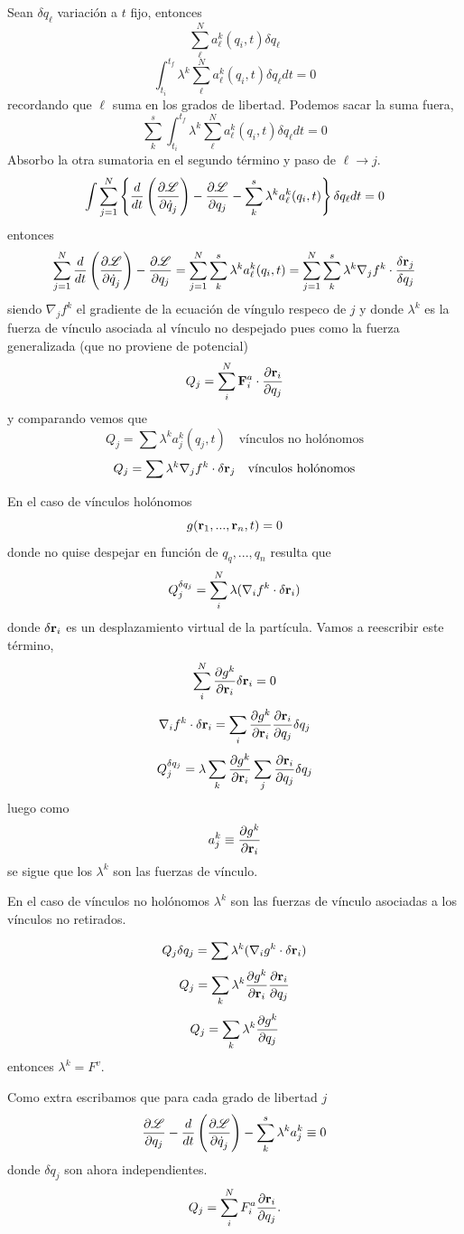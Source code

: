\documentclass[10pt,oneside]{CBFT_article}
\begin{document}
Sean $\delta q_\ell$ variación a $t$ fijo, entonces 
\[
\sum_{\ell}^N a_\ell^k(q_i,t) \delta {q}_\ell
\]
\[
\int_{t_i}^{t_f} \lambda^k \sum_{\ell}^N a_\ell^k(q_i,t) \delta {q}_\ell dt = 0
\]
recordando que $\ell$ suma en los grados de libertad. Podemos sacar la suma fuera,
\[
\sum_{k}^s \int_{t_i}^{t_f} \lambda^k \sum_{\ell}^N a_\ell^k(q_i,t) \delta {q}_\ell dt = 0
\]
Absorbo la otra sumatoria en el segundo término y paso de $\ell \to j$.
\[
\int  \sum_{j=1}^N \left\{ \frac{d}{dt}\left( \frac{\partial^{\hspace{-0.05em}} {\mathscr{L}}}{\partial {\dot{q}_j}^{\hspace{-0.05em}}} \right) -\frac{\partial^{\hspace{-0.05em}} {\mathscr{L}}}{\partial {q_j}^{\hspace{-0.05em}}}
- \sum_{k}^s \lambda^k a_\ell^k(q_i,t) \right\} \delta {q}_\ell dt = 0
\]
entonces 
\[
\sum_{j=1}^N \frac{d}{dt}\left( \dpar{\Lag}{\dot{q}_j} \right) -\dpar{\Lag}{q_j} =
\sum_{j=1}^N \sum_{k}^s \lambda^k a_\ell^k(q_i,t) =  
\sum_{j=1}^N \sum_{k}^s \lambda^k \nabla_j f^k \cdot \frac{\delta \vb{r}_j}{\delta q_j} 
\]
siendo $\nabla_j f^k $ el gradiente de la ecuación de víngulo respeco de $j$ y donde $\lambda^k$
es la fuerza de vínculo asociada al vínculo no despejado pues como la fuerza generalizada
(que no proviene de potencial)
\[
Q_j = \sum_i^N \vb{F}_i^a \cdot \dpar{\vb{r}_i}{q_j}
\]
y comparando vemos que 
\[
Q_j = \sum \lambda^k a^k_j(q_j,t) \quad \textrm{vínculos no holónomos}
\]
\[
Q_j=  \sum \lambda^k \nabla_j f^k \cdot \delta \vb{r}_j  \quad \textrm{vínculos holónomos}
\]

En el caso de vínculos holónomos 
\[
g(\vb{r}_1,...,\vb{r}_n,t) = 0 
\]
donde no quise despejar en función de $q_q,...,q_n$ resulta que 
\[
Q_j^{\delta q_j} =  \sum_i^N \lambda (\nabla_i f^k\cdot\delta\vb{r}_i)
\]
donde $\delta\vb{r}_i$ es un desplazamiento virtual de la partícula.
Vamos a reescribir este término,
\[
\sum_i^N \dpar{g^k}{\vb{r}_i} \delta \vb{r}_i = 0
\]
\[
\nabla_i f^k\cdot\delta\vb{r}_i = \sum_i \dpar{g^k}{\vb{r}_i} \dpar{\vb{r}_i}{q_j} \delta q_j
\]
\[
Q_j^{\delta q_j} =  \lambda \sum_k \dpar{g^k}{\vb{r}_i} \sum_j \dpar{\vb{r}_i}{q_j} \delta q_j
\]
luego como 
\[
a^k_j \equiv \dpar{g^k}{\vb{r}_i}
\]
se sigue que los $\lambda^k$ son las fuerzas de vínculo.

En el caso de vínculos no holónomos $\lambda^k$ son las fuerzas de vínculo asociadas a los 
vínculos no retirados.

\[
Q_j {\delta q_j} =  \sum \lambda^k (\nabla_i g^k\cdot\delta\vb{r}_i)
\]
\[
Q_j =  \sum_k \lambda^k \dpar{g^k}{\vb{r}_i} \dpar{\vb{r}_i}{q_j}
\]
\[
Q_j =  \sum_k \lambda^k \frac{\partial^{\hspace{-0.05em}} {g^k}}{\partial {q_j}^{\hspace{-0.05em}}}
\]
entonces $\lambda^k=F^v$.

Como extra escribamos que para cada grado de libertad $j$ 
\[
\frac{\partial^{\hspace{-0.05em}} {\mathscr{L}}}{\partial {q_j}^{\hspace{-0.05em}}} - \frac{d}{dt}\left( \frac{\partial^{\hspace{-0.05em}} {\mathscr{L}}}{\partial {\dot{q}_j}^{\hspace{-0.05em}}} \right) - \sum_k^s \lambda^k a_j^k \equiv 0
\]
donde $\delta q_j$ son ahora independientes.
\[
Q_j = \sum_i^N F_i^a \dpar{\vb{r}_i}{q_j}. 
\]





\end{document}
